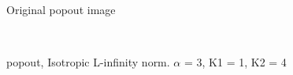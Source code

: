 \begin{figure}
  \centering
     \\
  \caption{Original popout image}
  \label{fig:popout}
\end{figure}

\begin{figure}
  \centering
     \\
  \caption{popout, Isotropic L-infinity norm. $\alpha$ = 3, K1 = 1, K2 = 4}
  \label{fig:popout_LINF_a3_k11_k24}
\end{figure}


